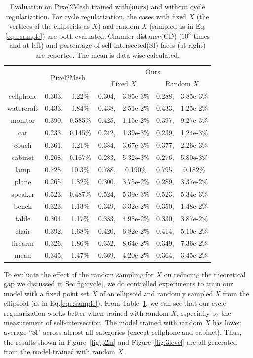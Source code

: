 \begin{table}
	\caption{Evaluation on Pixel2Mesh trained with(\textbf{ours}) and without cycle regularization. For cycle regularization, the cases with fixed $X$ (the vertices of the ellipsoids as $X$) and random $X$ (sampled as in Eq.\ref{equ:sample}) are both evaluated. Chamfer distance(CD) ($10^3$ times and at left) and percentage of self-intersected(SI) faces (at right) are reported. The mean is data-wise calculated.}
	\label{tab:p2m}
	\centering
	\begin{tabular}{|c|rc|rc|rc|}
		\hline
		&\multicolumn{2}{c|}{\multirow{2}{*}{Pixel2Mesh}}&\multicolumn{4}{c|}{Ours}\\
		\cline{4-7}
		~&~&~&\multicolumn{2}{c|}{Fixed $X$}&\multicolumn{2}{c|}{Random $X$}\\
		\hline
		cellphone&0.303,&0.22\%&0.304,&3.85e-3\%&0.288,&3.85e-3\%\\
		watercraft&0.433,&0.84\%&0.438,&2.51e-2\%&0.433,&1.25e-2\%\\
		monitor&0.390,&0.585\%&0.425,&1.15e-2\%&0.397,&9.27e-3\%\\
		car&0.233,&0.145\%&0.242,&1.39e-3\%&0.239,&1.24e-3\%\\
		couch&0.361,&0.21\%&0.384,&3.67e-3\%&0.377,&2.26e-3\%\\
		cabinet&0.268,&0.167\%&0.283,&5.32e-3\%&0.276,&5.80e-3\%\\
		lamp&0.728,&10.3\%&0.788,&0.190\%&0.795,&0.182\%\\
		plane&0.265,&1.82\%&0.300,&3.75e-2\%&0.289,&3.37e-2\%\\
		speaker&0.523,&0.487\%&0.524,&5.39e-3\%&0.523,&5.34e-3\%\\
		bench&0.323,&1.13\%&0.349,&3.32e-2\%&0.350,&1.48e-2\%\\
		table&0.304,&1.17\%&0.333,&4.98e-2\%&0.330,&3.87e-2\%\\
		chair&0.392,&1.68\%&0.420,&6.82e-2\%&0.414,&5.10e-2\%\\
		firearm&0.326,&1.86\%&0.352,&8.64e-2\%&0.349,&7.36e-2\%\\
		\hline
		mean &0.345,&1.47\%&0.369,& 4.20e-2\%&0.364,& 3.45e-2\%\\
		\hline
	\end{tabular}
\end{table}

To evaluate the effect of the random sampling for $X$ on reducing the theoretical gap we discussed in Sec\ref{fig:cycle}, we do controlled experiments to train our model with a fixed point set $X$ of an ellipsoid and randomly sampled $X$ from the ellipsoid (as in Eq.\ref{equ:sample}). From Table~\ref{tab:p2m}, we can see that our cycle regularization works better when trained with random $X$, especially by the measurement of self-intersection. The model trained with random $X$ has lower average ``SI" across almost all categories (except cellphone and cabinet). Thus, the results shown in Figure~\ref{fig:p2m} and Figure~\ref{fig:3level} are all generated from the model trained with random $X$. 

